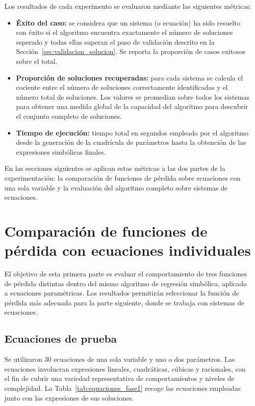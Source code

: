 Los resultados de cada experimento se evaluaron mediante las siguientes métricas:

\begin{itemize} \item \textbf{Éxito del caso:} se considera que un sistema (o ecuación) ha sido resuelto con éxito si el algoritmo encuentra exactamente el número de soluciones esperado y todas ellas superan el paso de validación descrito en la Sección~\ref{sec:validacion_solucion}. Se reporta la proporción de casos exitosos sobre el total.

\item \textbf{Proporción de soluciones recuperadas:} para cada sistema se calcula el cociente entre el número de soluciones correctamente identificadas y el número total de soluciones. Los valores se promedian sobre todos los sistemas para obtener una medida global de la capacidad del algoritmo para descubrir el conjunto completo de soluciones.

\item \textbf{Tiempo de ejecución:} tiempo total en segundos empleado por el algoritmo desde la generación de la cuadrícula de parámetros hasta la obtención de las expresiones simbólicas finales. \end{itemize}

En las secciones siguientes se aplican estas métricas a las dos partes de la experimentación: la comparación de funciones de pérdida sobre ecuaciones con una sola variable y la evaluación del algoritmo completo sobre sistemas de ecuaciones.

\section{Comparación de funciones de pérdida con ecuaciones individuales} \label{sec:fase1}

El objetivo de esta primera parte es evaluar el comportamiento de tres funciones de pérdida distintas dentro del mismo algoritmo de regresión simbólica, aplicado a ecuaciones paramétricas. Los resultados permitirán seleccionar la función de pérdida más adecuada para la parte siguiente, donde se trabaja con sistemas de ecuaciones.

\subsection{Ecuaciones de prueba}

Se utilizaron 30 ecuaciones de una sola variable y uno o dos parámetros. Las ecuaciones involucran expresiones lineales, cuadráticas, cúbicas y racionales, con el fin de cubrir una variedad representativa de comportamientos y niveles de complejidad. La Tabla~\ref{tab:equaciones_fase1} recoge las ecuaciones empleadas junto con las expresiones de sus soluciones.

